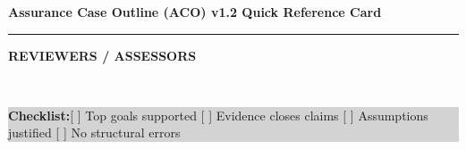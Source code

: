 \documentclass[10pt,letterpaper]{article}
\newcommand{\CardTitle}[1]{%
  \begin{center}
    {\Large\bfseries #1}\\[-2pt]
    \rule{0.92\linewidth}{0.6pt}
  \end{center}
}
\newcommand{\BannerBox}[1]{%
  \noindent\colorbox{Banner}{%
    \parbox{\linewidth}{\color{white}\bfseries\small\hspace{6pt}#1\hspace{6pt}}%
  }\\[10pt]
}
\begin{document}
\clearpage

\CardTitle{Assurance Case Outline (ACO) v1.2 Quick Reference Card}
\BannerBox{REVIEWERS / ASSESSORS}

\noindent\colorbox{LightGray}{%
\parbox{\linewidth}{\small
\textbf{Checklist:}\hspace{0.6em}[ ] Top goals supported \hspace{0.6em}\hspace{0.6em}[ ] Evidence closes claims \hspace{0.6em}\hspace{0.6em}[ ] Assumptions justified \hspace{0.6em}\hspace{0.6em}[ ] No structural errors
}}\\[6pt]
\end{document}

